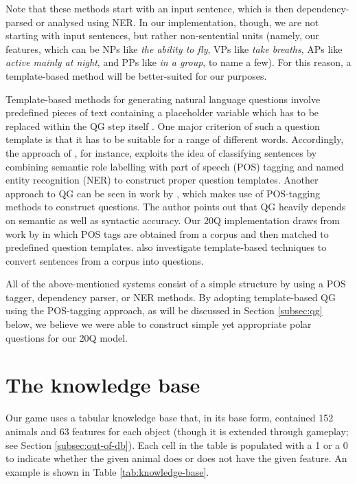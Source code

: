 \documentclass[11pt,a4paper]{article}
\begin{document}
Note that these methods start with an input sentence, which is then dependency-parsed or analysed using NER.
In our implementation, though, we are not starting with input sentences, but rather non-sentential units (namely, our features, which can be NPs like \textit{the ability to fly}, VPs like \textit{take breaths}, APs like \textit{active mainly at night}, and PPs like \textit{in a group}, to name a few).
For this reason, a template-based method will be better-suited for our purposes.

Template-based methods for generating natural language questions involve predefined pieces of text containing a placeholder variable which has to be replaced within the QG step itself \citep{Mandasari2019}. 
One major criterion of such a question template is that it has to be suitable for a range of different words. 
Accordingly, the approach of \citet{Mandasari2019}, for instance, exploits the idea of classifying sentences by combining semantic role labelling with part of speech (POS) tagging and named entity recognition (NER) to construct proper question templates. 
Another approach to QG can be seen in work by \citet{Zerr2014}, which makes use of POS-tagging methods to construct questions. 
The author points out that QG heavily depends on semantic as well as syntactic accuracy. 
Our 20Q implementation draws from work by \citet{Zerr2014} in which POS tags are obtained from a corpus and then matched to predefined question templates. 
\citet{FabbriEa2020} also investigate template-based techniques to convert sentences from a corpus into questions. 

All of the above-mentioned systems consist of a simple structure by using a POS tagger, dependency parser, or NER methods. 
By adopting template-based QG using the POS-tagging approach, as will be discussed in Section \ref{subsec:qg} below, we believe we were able to construct simple yet appropriate polar questions for our 20Q model.

\section{The knowledge base}
\label{sec:knowledge-base}

Our game uses a tabular knowledge base that, in its base form, contained 152 animals and 63 features for each object (though it is extended through gameplay; see Section \ref{subsec:out-of-db}).
Each cell in the table is populated with a 1 or a 0 to indicate whether the given animal does or does not have the given feature. 
An example is shown in Table \ref{tab:knowledge-base}.
\end{document}
